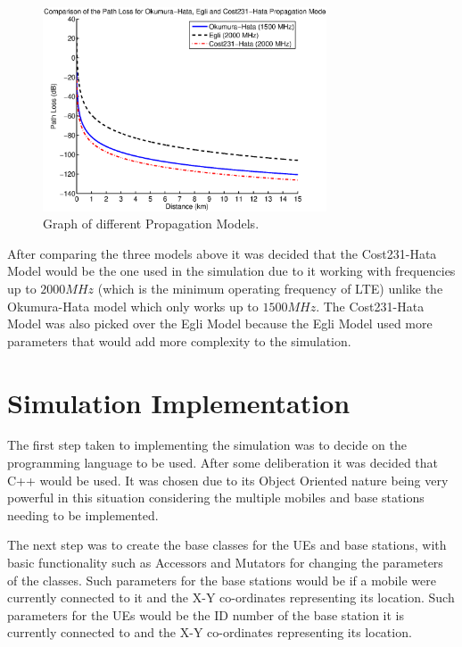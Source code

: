 \begin{figure}[H]
  \begin{center}
    	  \includegraphics[width=0.75\textwidth]{figures/simulation/prop.eps}
    \end{center}
    \caption{Graph of different Propagation Models.}
    \label{fig:prop}
\end{figure}
After comparing the three models above it was decided that the Cost231-Hata Model would be the one used in the simulation due to it working with frequencies up to $2000 MHz$ (which is the minimum operating frequency of LTE) unlike the Okumura-Hata model which only works up to $1500 MHz$. The Cost231-Hata Model was also picked over the Egli Model because the Egli Model used more parameters that would add more complexity to the simulation.~\cite{chebil2011comparison, shabbir2011comparison}

\section{Simulation Implementation}
The first step taken to implementing the simulation was to decide on the programming language to be used. After some deliberation it was decided that C++ would be used. It was chosen due to its Object Oriented nature being very powerful in this situation considering the multiple mobiles and base stations needing to be implemented.

The next step was to create the base classes for the UEs and base stations, with basic functionality such as Accessors and Mutators for changing the parameters of the classes. Such parameters for the base stations would be if a mobile were currently connected to it and the X-Y co-ordinates representing its location. Such parameters for the UEs would be the ID number of the base station it is currently connected to and the X-Y co-ordinates representing its location.


